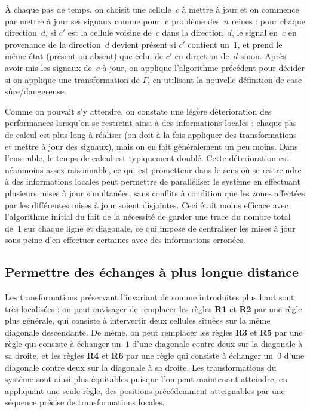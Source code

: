 À chaque pas de temps, on choisit une cellule~$c$ à mettre à jour et on commence par mettre à jour ses signaux comme pour le problème des~$n$ reines : pour chaque direction~$d$, si $c'$ est la cellule voisine de~$c$ dans la direction~$d$, le signal en~$c$ en provenance de la direction~$d$ devient présent si $c'$ contient un~$1$, et prend le même état (présent ou absent) que celui de $c'$ en direction de~$d$ sinon.
Après avoir mis les signaux de~$c$ à jour, on applique l'algorithme précédent pour décider si on applique une transformation de $\Gamma$, en utilisant la nouvelle définition de case sûre/dangereuse. 

Comme on pouvait s'y attendre, on constate une légère déterioration des performances lorsqu'on se restreint ainsi à des informations locales : chaque pas de calcul est plus long à réaliser (on doit à la fois appliquer des transformations et mettre à jour des signaux), mais on en fait généralement un peu moins. Dans l'ensemble, le temps de calcul est typiquement doublé. Cette déterioration est néanmoins assez raisonnable, ce qui est prometteur dans le sens où se restreindre à des informations locales peut permettre de paralléliser le système en effectuant plusieurs mises à jour simultanées, sans conflits à condition que les zones affectées par les différentes mises à jour soient disjointes. Ceci était moins efficace avec l'algorithme initial du fait de la nécessité de garder une trace du nombre total de~$1$ sur chaque ligne et diagonale, ce qui impose de centraliser les mises à jour sous peine d'en effectuer certaines avec des informations erronées.


\subsection{Permettre des échanges à plus longue distance}

Les transformations  préservant l'invariant de somme introduites  plus haut sont
très  localisées :  on peut  envisager de  remplacer les  règles  \textbf{R1} et
\textbf{R2}  par  une règle  plus  générale,  qui  consiste à  intervertir  deux
cellules situées sur  la même diagonale descendante. De  même, on peut remplacer
les  règles \textbf{R3} et  \textbf{R5} par  une règle  qui consiste  à échanger
un~$1$ d'une diagonale  contre deux sur la diagonale à sa  droite, et les règles
\textbf{R4} et  \textbf{R6} par une règle  qui consiste à  échanger un~$0$ d'une
diagonale  contre deux sur  la diagonale  à sa  droite.  Les  transformations du
système sont  ainsi plus équitables  puisque l'on peut maintenant  atteindre, en
appliquant  une seule  règle, des  positions précédemment  atteignables  par une
séquence précise de transformations locales.

